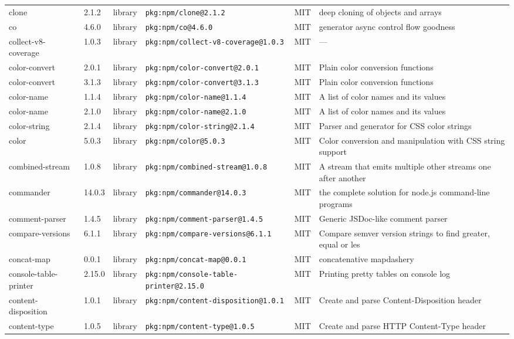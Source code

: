 \documentclass[11pt]{article}
\begin{document}
\begin{longtable}{|l|l|l|p{2.2cm}|l|p{4cm}|}
clone & 2.1.2 & library & \texttt{pkg:npm/clone@2.1.2} & MIT & deep cloning of objects and arrays \\
co & 4.6.0 & library & \texttt{pkg:npm/co@4.6.0} & MIT & generator async control flow goodness \\
collect-v8-coverage & 1.0.3 & library & \texttt{pkg:npm/collect-v8-coverage@1.0.3} & MIT & — \\
color-convert & 2.0.1 & library & \texttt{pkg:npm/color-convert@2.0.1} & MIT & Plain color conversion functions \\
color-convert & 3.1.3 & library & \texttt{pkg:npm/color-convert@3.1.3} & MIT & Plain color conversion functions \\
color-name & 1.1.4 & library & \texttt{pkg:npm/color-name@1.1.4} & MIT & A list of color names and its values \\
color-name & 2.1.0 & library & \texttt{pkg:npm/color-name@2.1.0} & MIT & A list of color names and its values \\
color-string & 2.1.4 & library & \texttt{pkg:npm/color-string@2.1.4} & MIT & Parser and generator for CSS color strings \\
color & 5.0.3 & library & \texttt{pkg:npm/color@5.0.3} & MIT & Color conversion and manipulation with CSS string support \\
combined-stream & 1.0.8 & library & \texttt{pkg:npm/combined-stream@1.0.8} & MIT & A stream that emits multiple other streams one after another \\
commander & 14.0.3 & library & \texttt{pkg:npm/commander@14.0.3} & MIT & the complete solution for node.js command-line programs \\
comment-parser & 1.4.5 & library & \texttt{pkg:npm/comment-parser@1.4.5} & MIT & Generic JSDoc-like comment parser \\
compare-versions & 6.1.1 & library & \texttt{pkg:npm/compare-versions@6.1.1} & MIT & Compare semver version strings to find greater, equal or les \\
concat-map & 0.0.1 & library & \texttt{pkg:npm/concat-map@0.0.1} & MIT & concatenative mapdashery \\
console-table-printer & 2.15.0 & library & \texttt{pkg:npm/console-table-printer@2.15.0} & MIT & Printing pretty tables on console log \\
content-disposition & 1.0.1 & library & \texttt{pkg:npm/content-disposition@1.0.1} & MIT & Create and parse Content-Disposition header \\
content-type & 1.0.5 & library & \texttt{pkg:npm/content-type@1.0.5} & MIT & Create and parse HTTP Content-Type header \\

\end{longtable}
\end{document}
